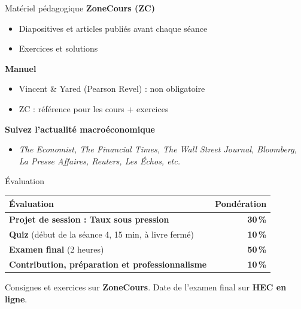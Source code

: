 \documentclass[aspectratio=169]{beamer}
\begin{document}
\begin{frame}{Matériel pédagogique}
   \textbf{ZoneCours (ZC)}
   \vspace{0.1cm}
   \begin{itemize}
      \setlength\itemsep{0.1cm}
      \item Diapositives et articles publiés avant chaque séance
      \item Exercices et solutions
   \end{itemize}
   \vspace{0.3cm}
   \textbf{Manuel}
   \vspace{0.1cm}
   \begin{itemize}
      \setlength\itemsep{0.1cm}
      \item Vincent \& Yared (Pearson Revel) : non obligatoire
      \item ZC : référence pour les cours + exercices
   \end{itemize}
   \vspace{0.3cm}
   \textbf{Suivez l'actualité macroéconomique}
   \vspace{0.1cm}
   \begin{itemize}
      \item \textit{The Economist, The Financial Times, The Wall Street Journal, Bloomberg, La Presse Affaires, Reuters, Les Échos, etc.}
   \end{itemize}
\end{frame}

\begin{frame}{Évaluation}
   \renewcommand{\arraystretch}{1.6}
   \begin{tabularx}{\textwidth}{@{}X r@{}}
      \toprule
      \textbf{Évaluation} & \textbf{Pondération} \\
      \midrule
      \textbf{Projet de session : Taux sous pression} & \textbf{30\,\%} \\
      \textbf{Quiz} {\small (début de la séance 4, 15 min, à livre fermé)} & \textbf{10\,\%} \\
      \textbf{Examen final} {\small (2 heures)} & \textbf{50\,\%} \\
      \textbf{Contribution, préparation et professionnalisme} & \textbf{10\,\%} \\
      \bottomrule
   \end{tabularx}
   \begin{defbox}
      \small Consignes et exercices sur \textbf{ZoneCours}. Date de l'examen final sur \textbf{HEC en ligne}.
   \end{defbox}
\end{frame}
\end{document}
